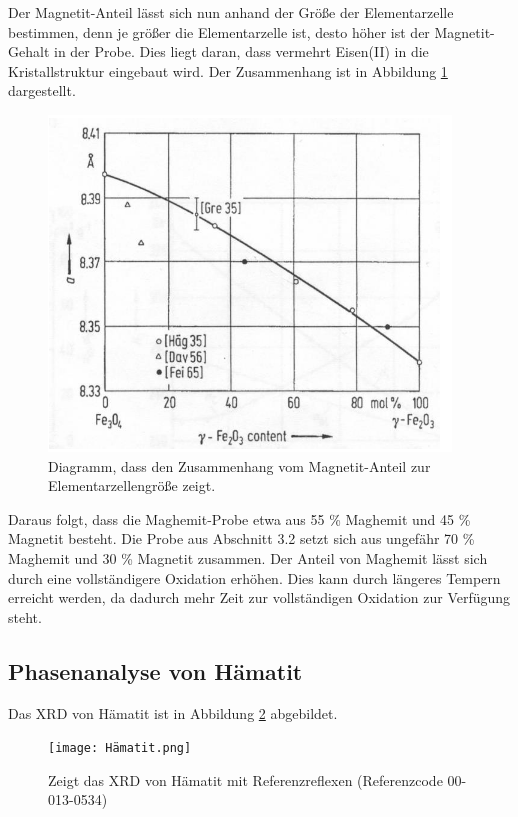 \documentclass[12pt, a4paper]{article}
\begin{document}
\noindent
Der Magnetit-Anteil lässt sich nun anhand der Größe der Elementarzelle bestimmen, denn je größer die Elementarzelle ist, desto höher ist der Magnetit-Gehalt in der Probe. Dies liegt daran, dass vermehrt Eisen(II) in die Kristallstruktur eingebaut wird. Der Zusammenhang ist in Abbildung \ref{diagramm} dargestellt.

\begin{figure}[!h]
    \centering
    \includegraphics{diagramm.png}
    \caption{Diagramm, dass den Zusammenhang vom Magnetit-Anteil zur Elementarzellengröße zeigt.}
    \label{diagramm}
\end{figure}

\noindent
Daraus folgt, dass die Maghemit-Probe etwa aus 55 \% Maghemit und 45 \% Magnetit besteht. Die Probe aus Abschnitt 3.2 setzt sich aus ungefähr 70 \% Maghemit und 30 \% Magnetit zusammen.
Der Anteil von Maghemit lässt sich durch eine vollständigere Oxidation erhöhen. Dies kann durch längeres Tempern erreicht werden, da dadurch mehr Zeit zur vollständigen Oxidation zur Verfügung steht.

\newpage

\subsection{Phasenanalyse von Hämatit}
Das XRD von Hämatit ist in Abbildung \ref{xrdhämatit} abgebildet.

\begin{figure}[!h]
    \texttt{[image: Hämatit.png]}
    \caption{Zeigt das XRD von Hämatit mit Referenzreflexen (Referenzcode 00-013-0534)}
    \label{xrdhämatit}
\end{figure}
\end{document}
